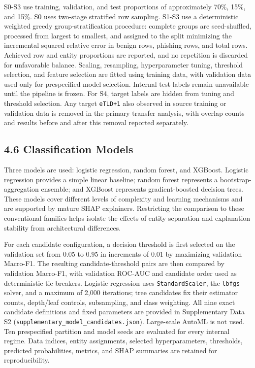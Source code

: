 \documentclass[
  10pt,
]{article}
\begin{document}
S0-S3 use training, validation, and test proportions of approximately
70\%, 15\%, and 15\%. S0 uses two-stage stratified row sampling. S1-S3
use a deterministic weighted greedy group-stratification procedure:
complete groups are seed-shuffled, processed from largest to smallest,
and assigned to the split minimizing the incremental squared relative
error in benign rows, phishing rows, and total rows. Achieved row and
entity proportions are reported, and no repetition is discarded for
unfavorable balance. Scaling, resampling, hyperparameter tuning,
threshold selection, and feature selection are fitted using training
data, with validation data used only for prespecified model selection.
Internal test labels remain unavailable until the pipeline is frozen.
For S4, target labels are hidden from tuning and threshold selection.
Any target \texttt{eTLD+1} also observed in source training or
validation data is removed in the primary transfer analysis, with
overlap counts and results before and after this removal reported
separately.

\subsection{4.6 Classification Models}\label{classification-models}

Three models are used: logistic regression, random forest, and XGBoost.
Logistic regression provides a simple linear baseline; random forest
represents a bootstrap-aggregation ensemble; and XGBoost represents
gradient-boosted decision trees. These models cover different levels of
complexity and learning mechanisms and are supported by mature SHAP
explainers. Restricting the comparison to these conventional families
helps isolate the effects of entity separation and explanation stability
from architectural differences.

For each candidate configuration, a decision threshold is first selected
on the validation set from 0.05 to 0.95 in increments of 0.01 by
maximizing validation Macro-F1. The resulting candidate-threshold pairs
are then compared by validation Macro-F1, with validation ROC-AUC and
candidate order used as deterministic tie breakers. Logistic regression
uses \texttt{StandardScaler}, the \texttt{lbfgs} solver, and a maximum
of 2,000 iterations; tree candidates fix their estimator counts,
depth/leaf controls, subsampling, and class weighting. All nine exact
candidate definitions and fixed parameters are provided in Supplementary
Data S2 (\texttt{supplementary\_model\_candidates.json}). Large-scale
AutoML is not used. Ten prespecified partition and model seeds are
evaluated for every internal regime. Data indices, entity assignments,
selected hyperparameters, thresholds, predicted probabilities, metrics,
and SHAP summaries are retained for reproducibility.
\end{document}
